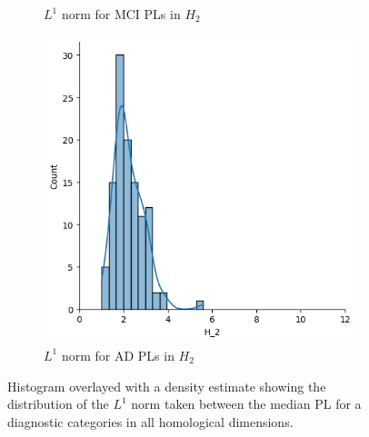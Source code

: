 \documentclass{article}
\begin{document}
\begin{figure}[htb]
\begin{subfigure}{0.32\textwidth}
    \caption{$L^1$ norm for MCI PLs in $H_2$}
  \end{subfigure}
  \begin{subfigure}{0.32\textwidth}
    \includegraphics[width=\textwidth]{figures/median_pls/median_pl_AD_H_2_displot.png}
    \caption{$L^1$ norm for AD PLs in $H_2$}
  \end{subfigure}
  \caption{Histogram overlayed with a density estimate showing the distribution of the $L^1$ norm
taken between the median PL for a diagnostic categories in all homological dimensions.}
\label{fig:displots_median_pl}
\end{figure}
\end{document}
